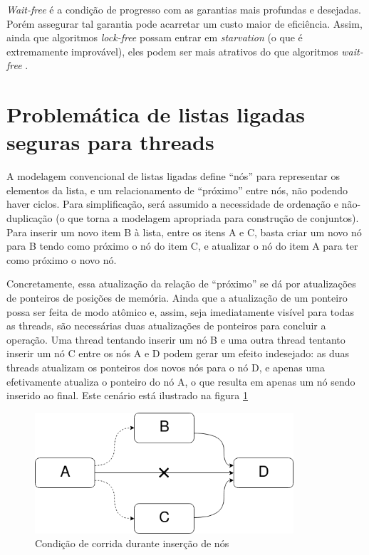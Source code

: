 \documentclass[a4paper,12pt,oldfontcommands]{abntex2}
\begin{document}
\textit{Wait-free} é a condição de progresso com as garantias mais profundas e desejadas. Porém assegurar tal garantia pode acarretar um custo maior de eficiência. Assim, ainda que algoritmos \textit{lock-free} possam entrar em \textit{starvation} (o que é extremamente improvável), eles podem ser mais atrativos do que algoritmos \textit{wait-free} \cite{herlihy2011art}.

\section{Problemática de listas ligadas seguras para threads}

A modelagem convencional de listas ligadas define ``nós'' para representar os elementos da lista, e um relacionamento de ``próximo'' entre nós, não podendo haver ciclos. Para simplificação, será assumido a necessidade de ordenação e não-duplicação (o que torna a modelagem apropriada para construção de conjuntos). Para inserir um novo item B à lista, entre os itens A e C, basta criar um novo nó para B tendo como próximo o nó do item C, e atualizar o nó do item A para ter como próximo o novo nó.

Concretamente, essa atualização da relação de ``próximo'' se dá por atualizações de ponteiros de posições de memória. Ainda que a atualização de um ponteiro possa ser feita de modo atômico e, assim, seja imediatamente visível para todas as threads, são necessárias duas atualizações de ponteiros para concluir a operação. Uma thread tentando inserir um nó B e uma outra thread tentanto inserir um nó C entre os nós A e D podem gerar um efeito indesejado: as duas threads atualizam os ponteiros dos novos nós para o nó D, e apenas uma efetivamente atualiza o ponteiro do nó A, o que resulta em apenas um nó sendo inserido ao final. Este cenário está ilustrado na figura \ref{figure-contention-insertion}

\begin{figure}[htbp]
    \centering
    \includegraphics[height=4.5cm]{img/contetion-insertion}
    \caption{Condição de corrida durante inserção de nós}
    \label{figure-contention-insertion}
\end{figure}
\end{document}
